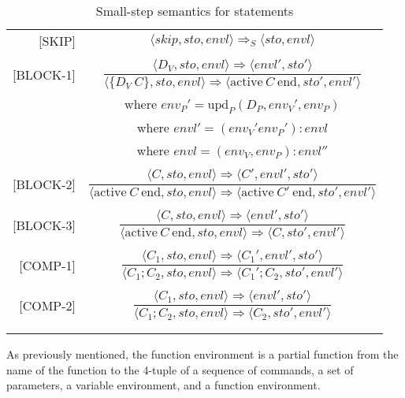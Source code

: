 \begin{longtable}[c] { r c }
  [SKIP] & \( 
    \langle skip, sto, envl \rangle \Rightarrow_S \langle sto, envl \rangle \) \\
  & \\

  [BLOCK-1] & \( 
    \dfrac{ \langle D_V, sto, envl \rangle \Rightarrow \langle envl', sto' \rangle }
      { \langle \{ D_V \ C \}, sto, envl \rangle \Rightarrow \langle \text{active} \ C \ \text{end}, sto', envl' \rangle} \) \\
  & where \(env_P' = \text{upd}_P(D_P, env_V', env_P) \) \\
  & where \(envl' = (env_V' env_P') : envl\) \\
  & where \(envl = (env_V, env_P) : envl'' \) \\
  & \\

  [BLOCK-2] & \( 
    \dfrac{ \langle C, sto, envl \rangle \Rightarrow \langle C', envl', sto' \rangle }
      { \langle \text{active} \ C \ \text{end}, sto, envl \rangle \Rightarrow \langle \text{active} \ C' \ \text{end}, sto', envl' \rangle} \) \\
  & \\

  [BLOCK-3] & \( 
    \dfrac{ \langle C, sto, envl \rangle \Rightarrow \langle envl', sto' \rangle}
      { \langle \text{active} \ C \ \text{end}, sto, envl \rangle \Rightarrow \langle C, sto', envl' \rangle} \) \\
  & \\

  [COMP-1] & \( 
    \dfrac{ \langle C_1, sto, envl \rangle \Rightarrow \langle C_1', envl', sto' \rangle}
      { \langle C_1;C_2, sto, envl \rangle \Rightarrow \langle C_1';C_2, sto', envl' \rangle} \) \\
  & \\

  [COMP-2] & \( 
    \dfrac{ \langle C_1, sto, envl \rangle \Rightarrow \langle envl', sto' \rangle}
      { \langle C_1;C_2, sto, envl \rangle \Rightarrow \langle C_2, sto', envl' \rangle} \) \\
  & \\

  \caption{Small-step semantics for statements}
\end{longtable}
        


As previously mentioned, the function environment is a partial function from the name of the function to the 4-tuple of a sequence of commands, a set of parameters, a variable environment, and a function environment.

